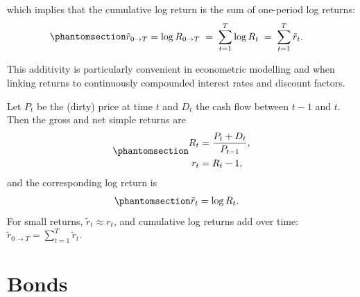 \documentclass[
  letterpaper,
  DIV=11,
  numbers=noendperiod]{scrreprt}
\begin{document}
which implies that the cumulative log return is the sum of one-period
log returns:
\begin{equation}\protect\phantomsection\label{eq-gen-0022}{  
\begin{align}
    \tilde{r}_{0 \rightarrow T}  &= \log R_{0 \rightarrow T}
     \;=\; \sum_{t=1}^{T} \log R_t
     \;=\; \sum_{t=1}^{T} \tilde{r}_t.
\end{align}
}\end{equation}

This additivity is particularly convenient in econometric modelling and
when linking returns to continuously compounded interest rates and
discount factors.

\begin{tcolorbox}[enhanced jigsaw, arc=.35mm, bottomrule=.15mm, bottomtitle=1mm, breakable, colback=white, colbacktitle=quarto-callout-note-color!10!white, colframe=quarto-callout-note-color-frame, coltitle=black, left=2mm, leftrule=.75mm, opacityback=0, opacitybacktitle=0.6, rightrule=.15mm, title=\textcolor{quarto-callout-note-color}{\faInfo}\hspace{0.5em}{Note}, titlerule=0mm, toprule=.15mm, toptitle=1mm]

Let \(P_t\) be the (dirty) price at time \(t\) and \(D_t\) the cash flow
between \(t-1\) and \(t\). Then the gross and net simple returns are
\begin{equation}\protect\phantomsection\label{eq-gen-0023}{  
\begin{align}
    R_t &= \frac{P_t + D_t}{P_{t-1}},\\
    r_t &= R_t - 1,
\end{align}
}\end{equation} and the corresponding log return is
\begin{equation}\protect\phantomsection\label{eq-gen-0024}{  
\begin{align}
    \tilde{r}_t &= \log R_t.
\end{align}
}\end{equation} For small returns, \(\tilde{r}_t \approx r_t\), and
cumulative log returns add over time:
\(\tilde{r}_{0\to T} = \sum_{t=1}^T \tilde{r}_t\).

\end{tcolorbox}


\chapter{Bonds}\label{bonds}
\end{document}
